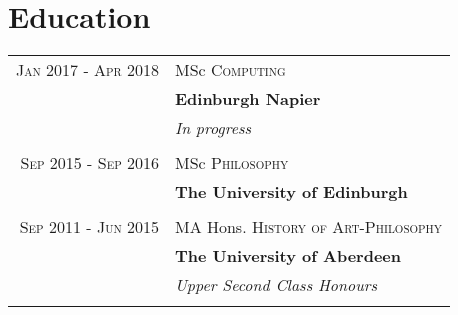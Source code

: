 \documentclass[12pt, a4paper]{article}
\begin{document}
\section{Education}

\begin{tabular}{rl}	
\textsc{Jan} 2017 - \textsc{Apr} 2018 & MSc \textsc{Computing} \\
&\textbf{Edinburgh Napier}\\
&\small\emph{In progress}\\
\\

\textsc{Sep} 2015 - \textsc{Sep} 2016 & MSc \textsc{Philosophy} \\ 
&\textbf{The University of Edinburgh}\\
\\

\textsc{Sep} 2011 - \textsc{Jun} 2015& MA Hons. \textsc{History of Art}-\textsc{Philosophy}\\ 
&\textbf{The University of Aberdeen}\\ 
&\small\emph{Upper Second Class Honours}\\
\\

\end{tabular}
\end{document}
